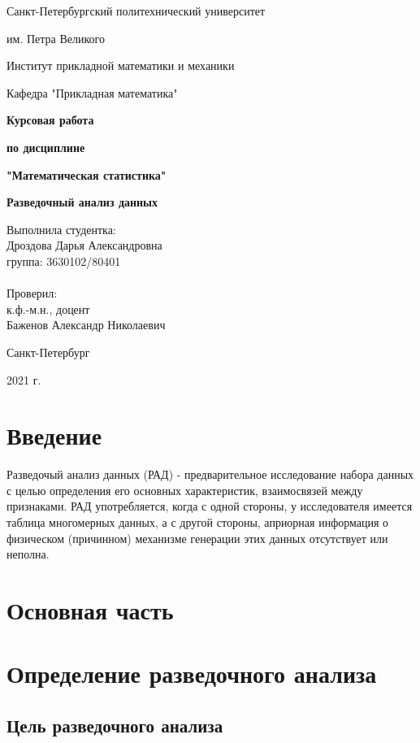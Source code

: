 \documentclass[a4paper, 12pt]{article}
\begin{document}
\begin{titlepage}
  \thispagestyle{empty}
  \centerline {Санкт-Петербургский политехнический университет}
  \centerline { им. Петра Великого}
  \centerline { }
  \centerline {Институт прикладной математики и механики} 
  \centerline {Кафедра "Прикладная математика"}
  \vfill
  \centerline{\textbf{Курсовая работа}}
  \centerline{\textbf{по дисциплине}}
  \centerline{\textbf{"Математическая статистика"}}
  \centerline{ }
  \centerline{\textbf{Разведочный анализ данных}}
  \vfill
  \hfill
  \begin{minipage}{0.45\textwidth}
  Выполнила студентка:\\
  Дроздова Дарья Александровна \\
  группа: 3630102/80401 \\
  \\
  Проверил:\\
  к.ф.-м.н., доцент \\
  Баженов Александр Николаевич
  \end{minipage}
  \vfill
  \centerline {Санкт-Петербург}   
  \centerline {2021 г.}  
\end{titlepage}

\newpage
\setcounter{page}{2}
\tableofcontents

\newpage
\listoffigures

\newpage
\section*{Введение}

Разведочый анализ данных (РАД) - предварительное исследование набора данных с целью  определения его основных характеристик, взаимосвязей между признаками. РАД употребляется, когда с одной стороны, у исследователя имеется таблица многомерных данных, а с другой стороны, априорная информация о физическом (причинном) механизме генерации этих данных отсутствует или неполна.

\newpage
\section*{Основная часть}

\section{Определение разведочного анализа}

\subsection{Цель разведочного анализа}
\end{document}
